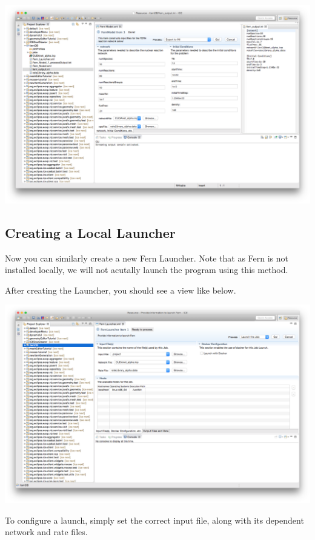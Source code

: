 \begin{center} \includegraphics[width=\textwidth]{figures/result}
\end{center}

\subsection{Creating a Local Launcher}

Now you can similarly create a new Fern Launcher. Note that as Fern is not
installed locally, we will not acutally launch the program using this method.

After creating the Launcher,
you should see a view like below. 
\begin{center} \includegraphics[width=\textwidth]{figures/launcher}
\end{center}
To configure a launch, simply set the correct
input file, along with its dependent network and rate files. 

